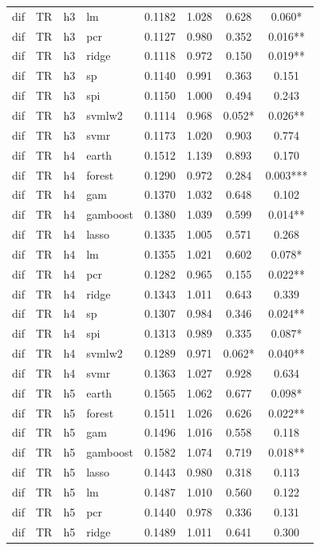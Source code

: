 \begin{ThreePartTable}
\begin{longtable}[t]{llclcccc}
dif & TR & h3 & lm & 0.1182 & 1.028 & 0.628 & 0.060*\\
dif & TR & h3 & pcr & 0.1127 & 0.980 & 0.352 & 0.016**\\
dif & TR & h3 & ridge & 0.1118 & 0.972 & 0.150 & 0.019**\\
dif & TR & h3 & sp & 0.1140 & 0.991 & 0.363 & 0.151\\
dif & TR & h3 & spi & 0.1150 & 1.000 & 0.494 & 0.243\\
dif & TR & h3 & svmlw2 & 0.1114 & 0.968 & 0.052* & 0.026**\\
dif & TR & h3 & svmr & 0.1173 & 1.020 & 0.903 & 0.774\\
\addlinespace
dif & TR & h4 & earth & 0.1512 & 1.139 & 0.893 & 0.170\\
dif & TR & h4 & forest & 0.1290 & 0.972 & 0.284 & 0.003***\\
dif & TR & h4 & gam & 0.1370 & 1.032 & 0.648 & 0.102\\
dif & TR & h4 & gamboost & 0.1380 & 1.039 & 0.599 & 0.014**\\
dif & TR & h4 & lasso & 0.1335 & 1.005 & 0.571 & 0.268\\
dif & TR & h4 & lm & 0.1355 & 1.021 & 0.602 & 0.078*\\
dif & TR & h4 & pcr & 0.1282 & 0.965 & 0.155 & 0.022**\\
dif & TR & h4 & ridge & 0.1343 & 1.011 & 0.643 & 0.339\\
dif & TR & h4 & sp & 0.1307 & 0.984 & 0.346 & 0.024**\\
dif & TR & h4 & spi & 0.1313 & 0.989 & 0.335 & 0.087*\\
dif & TR & h4 & svmlw2 & 0.1289 & 0.971 & 0.062* & 0.040**\\
dif & TR & h4 & svmr & 0.1363 & 1.027 & 0.928 & 0.634\\
\addlinespace
dif & TR & h5 & earth & 0.1565 & 1.062 & 0.677 & 0.098*\\
dif & TR & h5 & forest & 0.1511 & 1.026 & 0.626 & 0.022**\\
dif & TR & h5 & gam & 0.1496 & 1.016 & 0.558 & 0.118\\
dif & TR & h5 & gamboost & 0.1582 & 1.074 & 0.719 & 0.018**\\
dif & TR & h5 & lasso & 0.1443 & 0.980 & 0.318 & 0.113\\
dif & TR & h5 & lm & 0.1487 & 1.010 & 0.560 & 0.122\\
dif & TR & h5 & pcr & 0.1440 & 0.978 & 0.336 & 0.131\\
dif & TR & h5 & ridge & 0.1489 & 1.011 & 0.641 & 0.300\\

\end{longtable}
\end{ThreePartTable}
